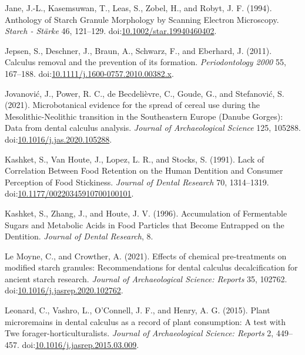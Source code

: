 \documentclass[utf8]{frontiers/frontiersSCNS}
\newlength{\cslhangindent}
\newlength{\cslentryspacingunit} %
\newenvironment{CSLReferences}[2] %
 {%
  \setlength{\parindent}{0pt}
  \ifodd #1
  \let\oldpar\par
  \def\par{\hangindent=\cslhangindent\oldpar}
  \fi
  \setlength{\parskip}{#2\cslentryspacingunit}
 }%
 {}
\begin{document}
\begin{CSLReferences}{1}{0}
\leavevmode{}%
Jane, J.-L., Kasemsuwan, T., Leas, S., Zobel, H., and Robyt, J. F. (1994). Anthology of {Starch Granule Morphology} by {Scanning Electron Microscopy}. \emph{Starch - Stärke} 46, 121--129. doi:\href{https://doi.org/10.1002/star.19940460402}{10.1002/star.19940460402}.

\leavevmode{}%
Jepsen, S., Deschner, J., Braun, A., Schwarz, F., and Eberhard, J. (2011). Calculus removal and the prevention of its formation. \emph{Periodontology 2000} 55, 167--188. doi:\href{https://doi.org/10.1111/j.1600-0757.2010.00382.x}{10.1111/j.1600-0757.2010.00382.x}.

\leavevmode{}%
Jovanović, J., Power, R. C., de Becdelièvre, C., Goude, G., and Stefanović, S. (2021). Microbotanical evidence for the spread of cereal use during the {Mesolithic-Neolithic} transition in the {Southeastern Europe} ({Danube Gorges}): {Data} from dental calculus analysis. \emph{Journal of Archaeological Science} 125, 105288. doi:\href{https://doi.org/10.1016/j.jas.2020.105288}{10.1016/j.jas.2020.105288}.

\leavevmode{}%
Kashket, S., Van Houte, J., Lopez, L. R., and Stocks, S. (1991). Lack of {Correlation Between Food Retention} on the {Human Dentition} and {Consumer Perception} of {Food Stickiness}. \emph{Journal of Dental Research} 70, 1314--1319. doi:\href{https://doi.org/10.1177/00220345910700100101}{10.1177/00220345910700100101}.

\leavevmode{}%
Kashket, S., Zhang, J., and Houte, J. V. (1996). Accumulation of {Fermentable Sugars} and {Metabolic Acids} in {Food Particles} that {Become Entrapped} on the {Dentition}. \emph{Journal of Dental Research}, 8.

\leavevmode{}%
Le Moyne, C., and Crowther, A. (2021). Effects of chemical pre-treatments on modified starch granules: {Recommendations} for dental calculus decalcification for ancient starch research. \emph{Journal of Archaeological Science: Reports} 35, 102762. doi:\href{https://doi.org/10.1016/j.jasrep.2020.102762}{10.1016/j.jasrep.2020.102762}.

\leavevmode{}%
Leonard, C., Vashro, L., O'Connell, J. F., and Henry, A. G. (2015). Plant microremains in dental calculus as a record of plant consumption: {A} test with {Twe} forager-horticulturalists. \emph{Journal of Archaeological Science: Reports} 2, 449--457. doi:\href{https://doi.org/10.1016/j.jasrep.2015.03.009}{10.1016/j.jasrep.2015.03.009}.


\end{CSLReferences}
\end{document}
